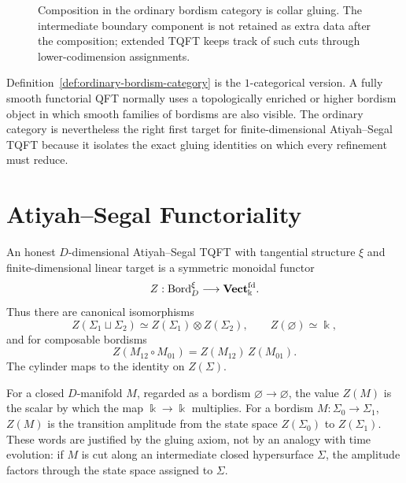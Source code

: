 \begin{figure}[H]
\centering
{}
\caption{Composition in the ordinary bordism category is collar gluing.  The
intermediate boundary component is not retained as extra data after the
composition; extended TQFT keeps track of such cuts through lower-codimension
assignments.}
\label{fig:tqft-collar-gluing}
\end{figure}

Definition~\ref{def:ordinary-bordism-category} is the \(1\)-categorical
version.  A fully smooth functorial QFT normally uses a topologically
enriched or higher bordism object in which smooth families of bordisms are
also visible.  The ordinary category is nevertheless the right first target
for finite-dimensional Atiyah--Segal TQFT because it isolates the exact
gluing identities on which every refinement must reduce.

\section{Atiyah--Segal Functoriality}

\begin{definition}
\label{def:atiyah-segal-tqft}
An honest \(D\)-dimensional Atiyah--Segal TQFT with tangential structure
\(\xi\) and finite-dimensional linear target is a symmetric monoidal functor
\[
  Z:\operatorname{Bord}^{\xi}_{D}
  \longrightarrow
  {\bf Vect}^{\rm fd}_{\Bbbk}.
\]
Thus there are canonical isomorphisms
\[
  Z(\Sigma_1\sqcup\Sigma_2)
  \simeq
  Z(\Sigma_1)\otimes Z(\Sigma_2),
  \qquad
  Z(\varnothing)\simeq \Bbbk,
\]
and for composable bordisms
\[
  Z(M_{12}\circ M_{01})=Z(M_{12})\,Z(M_{01}).
\]
The cylinder maps to the identity on \(Z(\Sigma)\).
\end{definition}

For a closed \(D\)-manifold \(M\), regarded as a bordism
\(\varnothing\to\varnothing\), the value \(Z(M)\) is the scalar by which the
map \(\Bbbk\to\Bbbk\) multiplies.  For a bordism
\(M:\Sigma_0\to\Sigma_1\), \(Z(M)\) is the transition amplitude from the
state space \(Z(\Sigma_0)\) to \(Z(\Sigma_1)\).  These words are justified by
the gluing axiom, not by an analogy with time evolution: if \(M\) is cut
along an intermediate closed hypersurface \(\Sigma\), the amplitude factors
through the state space assigned to \(\Sigma\).

